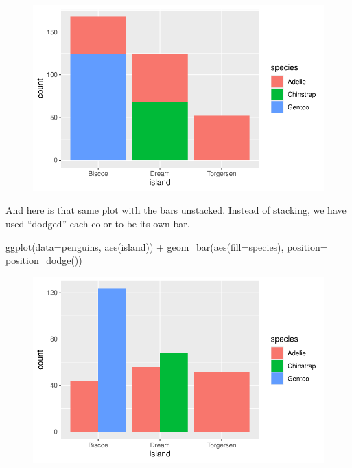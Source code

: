 \documentclass[
  letterpaper,
  DIV=11,
  numbers=noendperiod]{scrartcl}
\newenvironment{Shaded}{\begin{snugshade}}{\end{snugshade}}
\newcommand{\AttributeTok}[1]{\textcolor[rgb]{0.40,0.45,0.13}{#1}}
\newcommand{\FunctionTok}[1]{\textcolor[rgb]{0.28,0.35,0.67}{#1}}
\newcommand{\NormalTok}[1]{\textcolor[rgb]{0.00,0.23,0.31}{#1}}
\newcommand{\SpecialCharTok}[1]{\textcolor[rgb]{0.37,0.37,0.37}{#1}}
\begin{document}
\begin{figure}[H]

{\centering \includegraphics{Lab_2_files/figure-pdf/unnamed-chunk-11-1.pdf}

}

\end{figure}

And here is that same plot with the bars unstacked. Instead of stacking,
we have used ``dodged'' each color to be its own bar.

\begin{Shaded}
\begin{Highlighting}[]
\FunctionTok{ggplot}\NormalTok{(}\AttributeTok{data=}\NormalTok{penguins, }\FunctionTok{aes}\NormalTok{(island)) }\SpecialCharTok{+}
  \FunctionTok{geom\_bar}\NormalTok{(}\FunctionTok{aes}\NormalTok{(}\AttributeTok{fill=}\NormalTok{species), }\AttributeTok{position=} \FunctionTok{position\_dodge}\NormalTok{())}
\end{Highlighting}
\end{Shaded}

\begin{figure}[H]

{\centering \includegraphics{Lab_2_files/figure-pdf/unnamed-chunk-12-1.pdf}

}

\end{figure}
\end{document}
